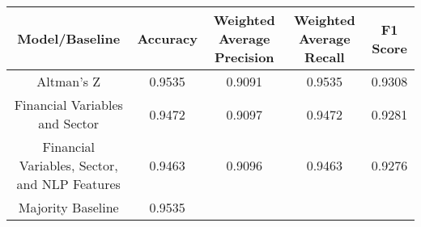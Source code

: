 \footnotesize
\begin{tabular}{ccccc}
\toprule
Model/Baseline & Accuracy & Weighted Average Precision & Weighted Average Recall & F1 Score \\
\midrule
Altman's Z & 0.9535 & 0.9091 & 0.9535 & 0.9308 \\
Financial Variables and Sector & 0.9472 & 0.9097 & 0.9472 & 0.9281 \\
Financial Variables, Sector, and NLP Features & 0.9463 & 0.9096 & 0.9463 & 0.9276 \\
Majority Baseline & 0.9535 &  &  &  \\
\bottomrule
\end{tabular}

\normalsize